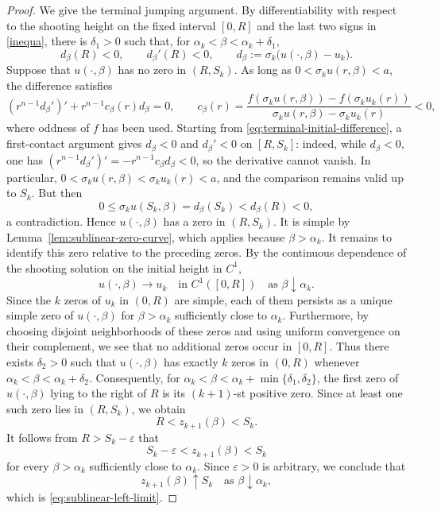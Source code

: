 \documentclass[11pt]{article}
\begin{document}
\begin{proof}
We give the terminal jumping argument.  By differentiability with respect to
the shooting height on the fixed interval $[0,R]$ and the last two signs in
\eqref{inequa}, there is $\delta_1>0$ such that, for
$\alpha_k<\beta<\alpha_k+\delta_1$,
\begin{equation}\label{eq:terminal-initial-difference}
 d_\beta(R)<0,
 \qquad d_\beta'(R)<0,
 \qquad
 d_\beta:=\sigma_k\bigl(u(\cdot,\beta)-u_k\bigr).
\end{equation}
Suppose that $u(\cdot,\beta)$ has no zero in $(R,S_k)$.  As long as
$0<\sigma_k u(r,\beta)<a$, the difference satisfies
\[
 (r^{n-1}d_\beta')'+r^{n-1}c_\beta(r)d_\beta=0,
 \qquad
 c_\beta(r)=
 \frac{f(\sigma_k u(r,\beta))-f(\sigma_k u_k(r))}
 {\sigma_k u(r,\beta)-\sigma_k u_k(r)}<0,
\]
where oddness of $f$ has been used.  Starting from
\eqref{eq:terminal-initial-difference}, a first-contact argument gives
$d_\beta<0$ and $d_\beta'<0$ on $[R,S_k]$: indeed, while
$d_\beta<0$, one has
$(r^{n-1}d_\beta')'=-r^{n-1}c_\beta d_\beta<0$, so the derivative
cannot vanish.  In particular,
$0<\sigma_k u(r,\beta)<\sigma_k u_k(r)<a$, and the comparison remains
valid up to $S_k$.  But then
\[
 0\leq \sigma_k u(S_k,\beta)
 =d_\beta(S_k)<d_\beta(R)<0,
\]
a contradiction.  Hence $u(\cdot,\beta)$ has a zero in $(R,S_k)$.
It is simple by Lemma~\ref{lem:sublinear-zero-curve}, which applies
because $\beta>\alpha_k$.
It remains to identify this zero relative to the preceding zeros.
By the {continuous dependence of the shooting solution on the
initial height in $C^1$},
\[
u(\cdot,\beta)\rightarrow u_k
\quad{\text{in }C^1([0,R])\quad\text{as }\beta\downarrow\alpha_k.}
\]
Since the \(k\) zeros of \(u_k\) in \((0,R)\) are simple, each of
them persists as a unique simple zero of \(u(\cdot,\beta)\) for
\(\beta>\alpha_k\) sufficiently close to \(\alpha_k\). Furthermore,
by choosing disjoint neighborhoods of these zeros and using uniform
convergence on their complement, we see that no additional zeros
occur in \([0,R]\). Thus there exists \(\delta_2>0\) such that
\(u(\cdot,\beta)\) has exactly \(k\) zeros in \((0,R)\) whenever $\alpha_k<\beta<\alpha_k+\delta_2$.
Consequently, for $\alpha_k<\beta<\alpha_k+\min\{\delta_1,\delta_2\}$,
the first zero of \(u(\cdot,\beta)\) lying to the right of \(R\) is
its \((k+1)\)-st positive zero. Since at least one such zero lies in
\((R,S_k)\), we obtain
\[
R<z_{k+1}(\beta)<S_k.
\]
It follows from \(R>S_k-\varepsilon\) that
\[
S_k-\varepsilon
<
z_{k+1}(\beta)
<
S_k
\]
for every \(\beta>\alpha_k\) sufficiently close to \(\alpha_k\).
Since \(\varepsilon>0\) is arbitrary, we conclude that
\[
z_{k+1}(\beta)\uparrow S_k\quad \text{as }\beta\downarrow\alpha_k,
\]
which is \eqref{eq:sublinear-left-limit}.
\end{proof}
\end{document}
